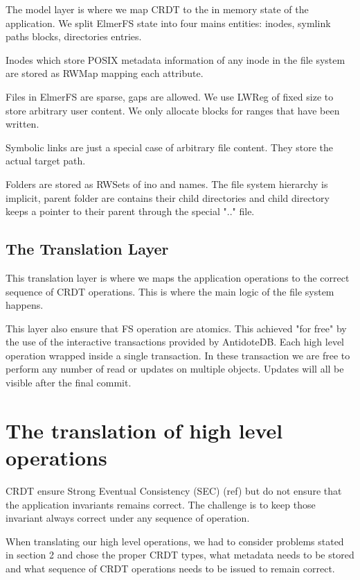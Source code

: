 \documentclass[sigplan, 10pt]{acmart}
\begin{document}
The model layer is where we map CRDT to the in memory
state of the application. We split ElmerFS state into
four mains entities: inodes, symlink paths blocks, directories entries.

Inodes which store POSIX metadata information of any inode in the file system
are stored as RWMap mapping each attribute.

Files in ElmerFS are sparse, gaps are allowed. We use LWReg
of fixed size to store arbitrary user content. We only allocate blocks
for ranges that have been written.

Symbolic links are just a special case of arbitrary file content. They
store the actual target path.

Folders are stored as RWSets of ino and names.
The file system hierarchy is implicit, parent folder are contains their child
directories and child directory keeps a pointer to their parent through the
special ".." file.

\subsection{The Translation Layer}

This translation layer is where we maps
the application operations to the correct sequence of CRDT operations.
This is where the main logic of the file system happens.

This layer also ensure that FS operation are atomics. This achieved "for free"
by the use of the interactive transactions provided by AntidoteDB. Each high
level operation wrapped inside a single transaction. In these transaction
we are free to perform any number of read or updates on multiple objects.
Updates will all be visible after the final commit.

\section{The translation of high level operations}

CRDT ensure Strong Eventual Consistency (SEC) (ref) but do
not ensure that the application invariants remains correct. The challenge
is to keep those invariant always correct under any sequence of
operation.

When translating our high level operations, we had to consider problems stated
in section 2 and chose the proper CRDT types, what metadata needs to be stored
and what sequence of CRDT operations needs to be issued to remain correct.
\end{document}
